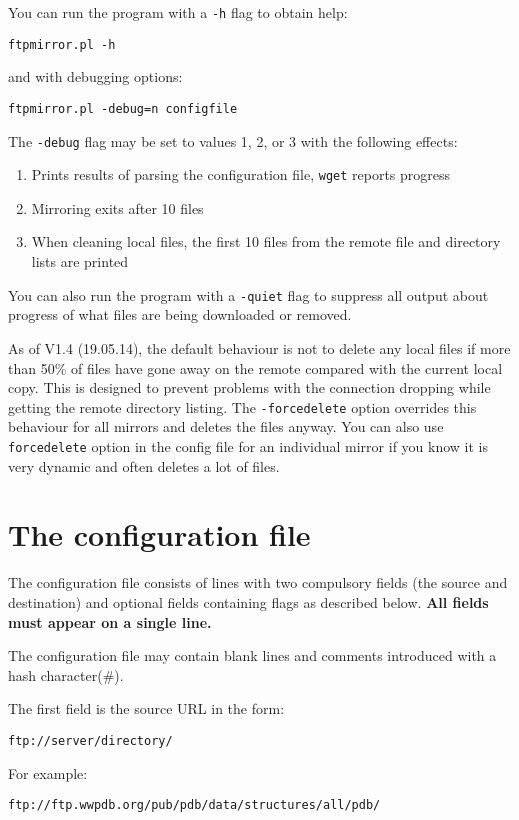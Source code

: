 \documentclass{article}
\begin{document}
You can run the program with a \verb|-h| flag to obtain help:
\begin{verbatim}
ftpmirror.pl -h
\end{verbatim}
and with debugging options:
\begin{verbatim}
ftpmirror.pl -debug=n configfile
\end{verbatim}
The \verb|-debug| flag may be set to values 1, 2, or 3 with the
following effects:
\begin{enumerate}
\item Prints results of parsing the configuration file, \verb|wget| reports
  progress 
\item Mirroring exits after 10 files
\item When cleaning local files, the first 10 files from the remote
  file and directory lists are printed
\end{enumerate}
\vspace{2em}

You can also run the program with a \verb|-quiet| flag to suppress all
output about progress of what files are being downloaded or removed.

As of V1.4 (19.05.14), the default behaviour is not to delete any
local files if more than 50\% of files have gone away on the remote
compared with the current local copy. This is designed to prevent
problems with the connection dropping while getting the remote
directory listing. The \verb|-forcedelete| option overrides this behaviour 
for all mirrors and deletes the files anyway. You can also use
\verb|forcedelete| option in the config file for an individual mirror
if you know it is very dynamic and often deletes a lot of files.


\section{The configuration file}
The configuration file consists of lines with two compulsory fields
(the source and destination) and optional fields containing flags as
described below. {\bfseries All fields must appear on a single line.}

The configuration file may contain blank lines and comments introduced
with a hash character(\#).
\vspace{2em}

The first field is the source URL in the form:
\begin{verbatim}
ftp://server/directory/
\end{verbatim}
For example:
\begin{verbatim}
ftp://ftp.wwpdb.org/pub/pdb/data/structures/all/pdb/
\end{verbatim}
\end{document}
